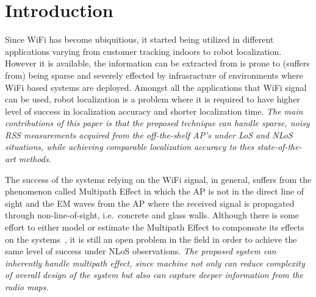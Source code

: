 \section{Introduction}
  Since WiFi has become ubiquitious, it started being utilized in different applications varying from customer tracking indoors to robot localization. %
  However it is available, the information can be extracted from is prone to (suffers from) being sparse and severely effected by infrasracture of environments where WiFi based systems are deployed.
  Amongst all the applications that WiFi signal can be used, robot localization is a problem where it is required to have higher level of success in localization accuracy and shorter localization time.
  \textit{The main contributions of this paper is that the proposed technique can handle sparse, noisy RSS measurements acquired from the off-the-shelf AP's under LoS and NLoS situations, while achieving comparable localization accuracy to thes state-of-the-art methods.}

  The success of the systems relying on the WiFi signal, in general, suffers from the phenomenon called Multipath Effect in which the AP is not in the direct line of sight and the EM waves from the AP where the received signal is propagated through non-line-of-sight, i.e.~concrete and glass walls.
  Although there is some effort to either model or estimate the Multipath Effect to componsate its effects on the systems~\cite{cai2015identification}, it is still an open problem in the field in order to achieve the same level of success under NLoS observations.
  \textit{The proposed system can inherently handle multipath effect, since machine not only can reduce complexity of overall design of the system but also can capture deeper information from the radio maps.}

